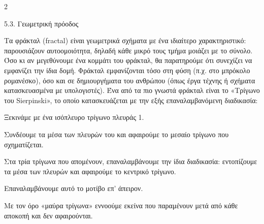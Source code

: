 \begin{ylh}{2}
    \item 5.3. Γεωμετρική πρόοδος
\end{ylh}

Τα φράκταλ (fractal) είναι γεωμετρικά σχήματα με ένα ιδιαίτερο χαρακτηριστικό: παρουσιάζουν αυτοομοιότητα, δηλαδή κάθε μικρό τους τμήμα μοιάζει με το σύνολο. Όσο κι αν μεγεθύνουμε ένα κομμάτι του φράκταλ, θα παρατηρούμε ότι συνεχίζει να εμφανίζει την ίδια δομή. Φράκταλ εμφανίζονται τόσο στη φύση (π.χ. στο μπρόκολο ρομανέσκο), όσο και σε δημιουργήματα του ανθρώπου (όπως έργα τέχνης ή σχήματα κατασκευασμένα με υπολογιστές). Ένα από τα πιο γνωστά φράκταλ είναι το «Τρίγωνο του Sierpinski», το οποίο κατασκευάζεται με την εξής επαναλαμβανόμενη διαδικασία:

\begin{alist}
\item Ξεκινάμε με ένα ισόπλευρο τρίγωνο πλευράς 1.
\item Συνδέουμε τα μέσα των πλευρών του και αφαιρούμε το μεσαίο τρίγωνο που σχηματίζεται.
\item Στα τρία τρίγωνα που απομένουν, επαναλαμβάνουμε την ίδια διαδικασία: εντοπίζουμε τα μέσα των πλευρών και αφαιρούμε το κεντρικό τρίγωνο.
\item Επαναλαμβάνουμε αυτό το μοτίβο επ' άπειρον.

Με τον όρο «μαύρα τρίγωνα» εννοούμε εκείνα που παραμένουν μετά από κάθε αποκοπή και δεν αφαιρούνται.

\begin{center}
\end{center}
\end{alist}
